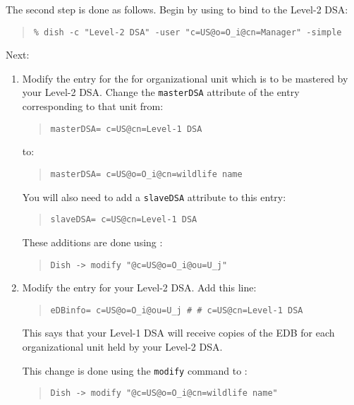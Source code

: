 The second step is done as follows.
Begin by using  to bind to the Level-2 DSA:
\begin{quote}\smaller\begin{verbatim}
% dish -c "Level-2 DSA" -user "c=US@o=O_i@cn=Manager" -simple
\end{verbatim}\end{quote}
Next:
\begin{enumerate}
\item	Modify the entry for the for organizational unit which is to be
mastered by your Level-2 DSA.
Change the \verb"masterDSA" attribute of the entry corresponding to that
unit from:
\begin{quote}\small\begin{verbatim}
masterDSA= c=US@cn=Level-1 DSA
\end{verbatim}\end{quote}
to:
\begin{quote}\small\begin{verbatim}
masterDSA= c=US@o=O_i@cn=wildlife name
\end{verbatim}\end{quote}
You will also need to add a \verb"slaveDSA" attribute to this entry:
\begin{quote}\small\begin{verbatim}
slaveDSA= c=US@cn=Level-1 DSA
\end{verbatim}\end{quote}

These additions are done using :
\begin{quote}\small\begin{verbatim}
Dish -> modify "@c=US@o=O_i@ou=U_j"
\end{verbatim}\end{quote}

\item	Modify the entry for your Level-2 DSA.
Add this line:
\begin{quote}\small\begin{verbatim}
eDBinfo= c=US@o=O_i@ou=U_j # # c=US@cn=Level-1 DSA
\end{verbatim}\end{quote}
This says that your Level-1 DSA will receive copies of the EDB for each
organizational unit held by your Level-2 DSA.

This change is done using the \verb"modify" command to :
\begin{quote}\small\begin{verbatim}
Dish -> modify "@c=US@o=O_i@cn=wildlife name"
\end{verbatim}\end{quote}


\end{enumerate}
